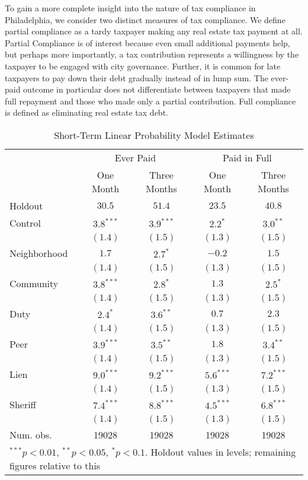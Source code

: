 \documentclass[12pt]{article}
\begin{document}
To gain a more complete insight into the nature of tax compliance in
Philadelphia, we consider two distinct measures of tax compliance. We
define partial compliance as a tardy taxpayer making any real estate
tax payment at all.  Partial Compliance is of interest because even
small additional payments help, but perhaps more importantly, a tax
contribution represents a willingness by the taxpayer to be engaged
with city governance.  Further, it is common for late taxpayers to pay
down their debt gradually instead of in lump sum. The ever-paid
outcome in particular does not differentiate between taxpayers that
made full repayment and those who made only a partial contribution.
Full compliance is defined as eliminating real estate tax debt.

\begin{table}[htb]
\centering
\caption{Short-Term Linear Probability Model Estimates} \label{sh_lin}
\bigskip
\begin{tabular}{l c c c c }
\hline
 & \multicolumn{2}{c}{Ever Paid} & \multicolumn{2}{c}{Paid in Full} \\
          & One Month & Three Months & One Month & Three Months \\
Holdout   & $30.5$ & $51.4$ & $23.5$ & $40.8$ \\
\hline
Control   & $3.8^{***}$  & $3.9^{***}$  & $2.2^{*}$    & $3.0^{**}$   \\
          & $(1.4)$      & $(1.5)$      & $(1.3)$      & $(1.5)$      \\
Neighborhood & $1.7$        & $2.7^{*}$    & $-0.2$       & $1.5$        \\
          & $(1.4)$      & $(1.5)$      & $(1.3)$      & $(1.5)$      \\
Community     & $3.8^{***}$  & $2.8^{*}$    & $1.3$        & $2.5^{*}$    \\
          & $(1.4)$      & $(1.5)$      & $(1.3)$      & $(1.5)$      \\
Duty      & $2.4^{*}$    & $3.6^{**}$   & $0.7$        & $2.3$        \\
          & $(1.4)$      & $(1.5)$      & $(1.3)$      & $(1.5)$      \\
Peer      & $3.9^{***}$  & $3.5^{**}$   & $1.8$        & $3.4^{**}$   \\
          & $(1.4)$      & $(1.5)$      & $(1.3)$      & $(1.5)$      \\
Lien      & $9.0^{***}$  & $9.2^{***}$  & $5.6^{***}$  & $7.2^{***}$  \\
          & $(1.4)$      & $(1.5)$      & $(1.3)$      & $(1.5)$      \\
Sheriff   & $7.4^{***}$  & $8.8^{***}$  & $4.5^{***}$  & $6.8^{***}$  \\
          & $(1.4)$      & $(1.5)$      & $(1.3)$      & $(1.5)$      \\
\hline
Num. obs. & 19028        & 19028        & 19028        & 19028        \\
\hline
\multicolumn{5}{l}{\scriptsize{$^{***}p<0.01$, $^{**}p<0.05$,
    $^*p<0.1$. Holdout values in levels; remaining figures relative to
    this}}
\end{tabular}
\end{table}
\end{document}
